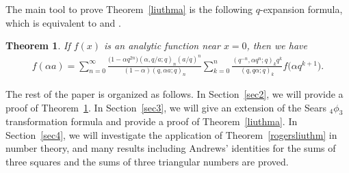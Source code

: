 \documentclass[pdftex]{sigma}
\numberwithin{equation}{section}
\newtheorem{Theorem}{Theorem}[section]
\begin{document}
The main tool to prove Theorem~\ref{liuthma} is the following
$q$-expansion formula, which is equivalent to \cite[Theorem~2]{Liu2002} and \cite[Theorem~1.1]{Liu2013RamanJ}.
\begin{Theorem}\label{liuthm} If $f(x)$ is an analytic function near $x=0$, then we have
	\begin{align}\label{newliuexpthm}
		f(\alpha a)
		=\sum_{n=0}^\infty \frac{\bigl(1-\alpha q^{2n}\bigr)(\alpha, q/a; q)_n (a/q)^n}
		{(1-\alpha)(q, \alpha a; q)_n} \sum_{k=0}^n \frac{(q^{-n}, \alpha q^n; q)_k q^k}
		{(q, q\alpha; q)_k} f\bigl(\alpha q^{k+1}\bigr).
	\end{align}
\end{Theorem}
The rest of the paper is organized as follows. In Section~\ref{sec2}, we will provide a proof of Theorem~\ref{liuthm}. In Section~\ref{sec3}, we will give an extension of the Sears $_4\phi_3$ transformation formula and provide a proof of Theorem~\ref{liuthma}. In Section~\ref{sec4}, we will investigate the application of Theorem~\ref{rogersliuthm} in number theory, and many results including Andrews' identities for the sums of three squares and the sums of three triangular numbers are proved.
\end{document}
